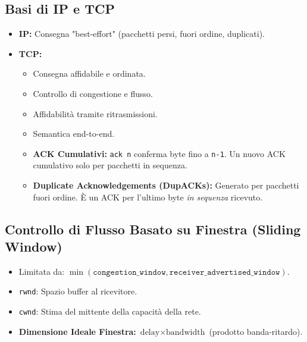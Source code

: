 \documentclass{article}
\begin{document}
\subsection{Basi di IP e TCP}
\begin{itemize}
    \item \textbf{IP:} Consegna "best-effort" (pacchetti persi, fuori ordine, duplicati).
    \item \textbf{TCP:}
    \begin{itemize}
        \item Consegna affidabile e ordinata.
        \item Controllo di congestione e flusso.
        \item Affidabilità tramite ritrasmissioni.
        \item Semantica end-to-end.
        \item \textbf{ACK Cumulativi:} \texttt{ack n} conferma byte fino a \texttt{n-1}. Un nuovo ACK cumulativo solo per pacchetti in sequenza.
        \item \textbf{Duplicate Acknowledgements (DupACKs):} Generato per pacchetti fuori ordine. È un ACK per l'ultimo byte \textit{in sequenza} ricevuto.
    \end{itemize}
\end{itemize}

\subsection{Controllo di Flusso Basato su Finestra (Sliding Window)}
\begin{itemize}
    \item Limitata da: $\min(\texttt{congestion\_window}, \texttt{receiver\_advertised\_window})$.
    \item \texttt{rwnd}: Spazio buffer al ricevitore.
    \item \texttt{cwnd}: Stima del mittente della capacità della rete.
    \item \textbf{Dimensione Ideale Finestra:} $\text{delay} \times \text{bandwidth}$ (prodotto banda-ritardo).
\end{itemize}
\end{document}
